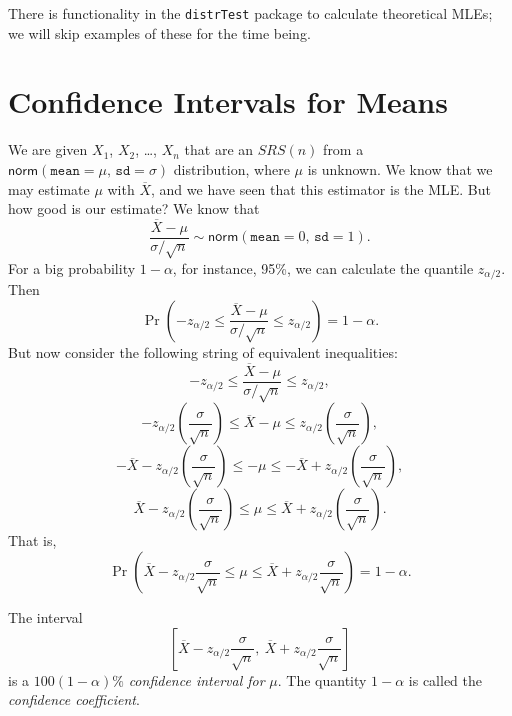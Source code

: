 \documentclass[captions=tableheading]{scrbook}
\begin{document}
There is functionality in the \texttt{distrTest} package \cite{Ruckdescheldistr} to calculate theoretical MLEs; we will skip examples of these for the time being.
\section{Confidence Intervals for Means}
\label{sec-9-2}
\label{sec-Confidence-Intervals-for-Means}


We are given \(X_{1}\), \(X_{2}\), \ldots{}, \(X_{n}\) that are an \(SRS(n)\) from a \(\mathsf{norm}(\mathtt{mean}=\mu,\,\mathtt{sd}=\sigma)\) distribution, where \(\mu\) is unknown. We know that we may estimate \(\mu\) with \(\overline{X}\), and we have seen that this estimator is the MLE. But how good is our estimate? We know that 
\begin{equation} 
\frac{\overline{X}-\mu}{\sigma/\sqrt{n}}\sim\mathsf{norm}(\mathtt{mean}=0,\,\mathtt{sd}=1).
\end{equation}
For a big probability \(1-\alpha\), for instance, 95\%, we can calculate the quantile \(z_{\alpha/2}\). Then
\begin{equation}
\Pr\left(-z_{\alpha/2}\leq\frac{\overline{X}-\mu}{\sigma/\sqrt{n}}\leq z_{\alpha/2}\right)=1-\alpha.
\end{equation}
But now consider the following string of equivalent inequalities:
\[
-z_{\alpha/2}\leq\frac{\overline{X}-\mu}{\sigma/\sqrt{n}}\leq z_{\alpha/2},
\]
\[
-z_{\alpha/2}\left(\frac{\sigma}{\sqrt{n}}\right)\leq\overline{X}-\mu\leq z_{\alpha/2}\left(\frac{\sigma}{\sqrt{n}}\right),
\]
\[
-\overline{X}-z_{\alpha/2}\left(\frac{\sigma}{\sqrt{n}}\right)\leq-\mu\leq-\overline{X}+z_{\alpha/2}\left(\frac{\sigma}{\sqrt{n}}\right),
\]
\[
\overline{X}-z_{\alpha/2}\left(\frac{\sigma}{\sqrt{n}}\right)\leq\mu\leq\overline{X}+z_{\alpha/2}\left(\frac{\sigma}{\sqrt{n}}\right).
\]
That is, 
\begin{equation}
\Pr\left(\overline{X}-z_{\alpha/2}\frac{\sigma}{\sqrt{n}}\leq\mu\leq\overline{X}+z_{\alpha/2}\frac{\sigma}{\sqrt{n}}\right)=1-\alpha.
\end{equation}

\begin{defn}
The interval
\begin{equation}
\left[\overline{X}-z_{\alpha/2}\frac{\sigma}{\sqrt{n}},\ \overline{X}+z_{\alpha/2}\frac{\sigma}{\sqrt{n}}\right]
\end{equation}
is a \(100(1-\alpha)\%\) \emph{confidence interval for} \(\mu\). The quantity \(1-\alpha\) is called the \emph{confidence coefficient}.
\end{defn}
\end{document}
